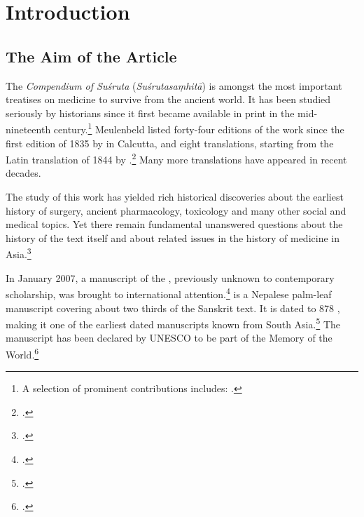 \section{Introduction}

\subsection{The Aim of the Article}

The \emph{Compendium of Suśruta} (\emph{Suśrutasaṃhitā}) is amongst the most
important treatises on medicine to survive from the ancient world. It has been
studied seriously by historians since it first became available in print in the
mid-nineteenth century.\footnote{A selection of prominent contributions includes:
    \cite{hoer-1897,hoer-1906a,hoer-1906b,hoer-1907a,hoer-1907,stra-1934,
        sing-1972a,shar-1975, ray-1980, adri-1984,
        yano-1986,meul-hist,shar-1999,vali-2007}.} %
Meulenbeld listed forty-four editions of the work since the first edition of 1835
by \citeauthor{gupt-1835} in Calcutta, and eight translations, starting from the
Latin translation of 1844 by \citeauthor{hess-1855}.\footcite[IB,
311\,ff.]{meul-hist}   Many more translations have appeared in recent decades.

The study of this work has yielded rich historical discoveries about 
the earliest history of surgery, ancient pharmacology, toxicology and many other 
social and medical topics. Yet there remain fundamental unanswered questions 
about the history of the text itself and about related issues in the history of 
medicine in Asia.\footcite[IA, 203–389]{meul-hist}

In January 2007, a manuscript of the \SS, previously unknown to contemporary
scholarship, was brought to international attention.\footcite{dimi-kais}
 is a Nepalese palm-leaf manuscript covering about two
thirds of the Sanskrit text. It is dated to 878 \CE, making it one of the
earliest dated manuscripts known from South Asia.\footcite[87–88]{hari-2011} The
manuscript has been declared by UNESCO to be part of the Memory of the 
World.\footcite{unes-2013}

